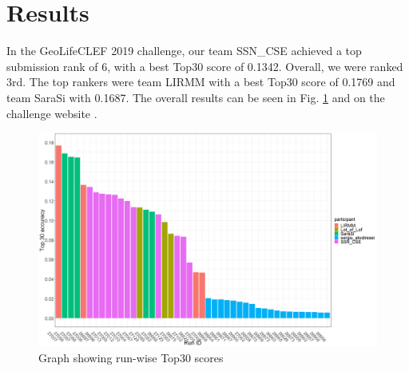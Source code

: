 \documentclass[runningheads]{llncs}
\begin{document}
\section{Results}
In the GeoLifeCLEF 2019 challenge, our team SSN\_CSE achieved a top submission rank of 6, with a best Top30 score of 0.1342. Overall, we were ranked 3rd. The top rankers were team LIRMM with a best Top30 score of 0.1769 and team SaraSi with 0.1687. The overall results can be seen in Fig. \ref{fig:t30} and on the challenge website \cite{web}.
\begin{figure}[H]
    \centering
    \includegraphics[scale=0.25]{top30.png}
    \setlength{\abovecaptionskip}{15pt}
    \setlength{\belowcaptionskip}{2 pt}
    \caption{Graph showing run-wise Top30 scores}
    \label{fig:t30}
\end{figure}
\end{document}
